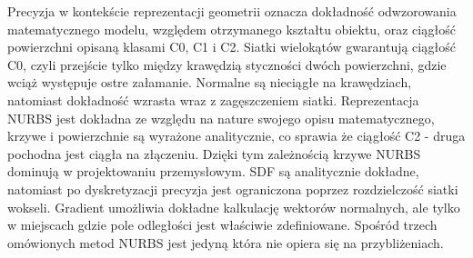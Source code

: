 Precyzja w kontekście reprezentacji geometrii oznacza dokładność odwzorowania matematycznego modelu, względem otrzymanego kształtu obiektu, oraz ciągłość powierzchni opisaną klasami C0, C1 i C2. Siatki wielokątów gwarantują ciągłość C0, czyli przejście tylko między krawędzią styczności dwóch powierzchni, gdzie wciąż występuje ostre załamanie. Normalne są nieciągłe na krawędziach, natomiast dokładność wzrasta wraz z zagęszczeniem siatki. Reprezentacja NURBS jest dokładna ze względu na nature swojego opisu matematycznego, krzywe i powierzchnie są wyrażone analitycznie, co sprawia że ciągłość C2 - druga pochodna jest ciągła na złączeniu. Dzięki tym zależnością krzywe NURBS dominują w projektowaniu przemysłowym. SDF są analitycznie dokładne, natomiast po dyskretyzacji precyzja jest ograniczona poprzez rozdzielczość siatki wokseli. Gradient umożliwia dokładne kalkulację wektorów normalnych, ale tylko w miejscach gdzie pole odległości jest właściwie zdefiniowane. Spośród trzech omówionych metod NURBS jest jedyną która nie opiera się na przybliżeniach.

